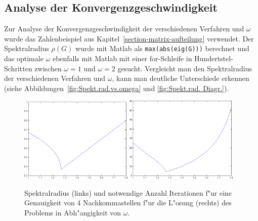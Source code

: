 \begin{refsection}
\subsection{Analyse der Konvergenzgeschwindigkeit \label{subsec: Konv.geschw.analyse}}
Zur Analyse der Konvergenzgeschwindigkeit der verschiedenen
Verfahren und $\omega$ wurde das Zahlenbeispiel aus
Kapitel~\ref{section-matrix-aufteilung} verwendet.
Der Spektralradius $\rho(G)$ wurde mit Matlab als
\texttt{max(abs(eig(G)))} berechnet und das optimale $\omega$ ebenfalls
mit Matlab mit einer for-Schleife in Hundertstel-Schritten
zwischen $\omega=1$ und $\omega=2$ gesucht.
Vergleicht man den Spektralradius der verschiedenen Verfahren und
$\omega$, kann man deutliche Unterschiede erkennen (siehe
Abbildungen~\ref{fig:Spekt.rad.vs.omega}
und \ref{fig:Spekt.rad. Diagr.}).
\begin{figure}\centering
\includegraphics[width=0.48\textwidth]{sor/img/Spektralradius.png}
\hfill
\includegraphics[width=0.48\textwidth]{sor/img/NumIt.png}
\caption{Spektralradius (links) und
notwendige Anzahl Iterationen f"ur  eine Genauigkeit von 4 Nachkommastellen
f"ur die L"osung (rechts)
des Problems in Abh"angigkeit von $\omega$.
\label{fig:Spekt.rad.vs.omega}
\label{fig:Spekt.rad.vs.Anz.It.}
}
\end{figure}


\end{refsection}
